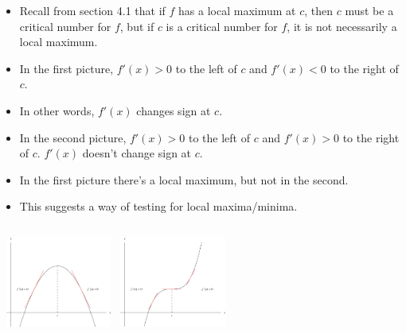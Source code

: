 \begin{frame}
\begin{itemize}
\item  Recall from section 4.1 that if $f$ has a local maximum at $c$, then $c$ must be a critical number for $f$, but if $c$ is a critical number for $f$, it is not necessarily a local maximum.
\item<2->  In the first picture, $f'(x) > 0$ to the left of $c$ and $f'(x) < 0$ to the right of $c$.
\item<3->  In other words, $f'(x)$ changes sign at $c$.
\item<4->  In the second picture, $f'(x) > 0$ to the left of $c$ and $f'(x) > 0$ to the right of $c$.  $f'(x)$ doesn't change sign at $c$.
\item<5->  In the first picture there's a local maximum, but not in the second.
\item<6->  This suggests a way of testing for local maxima/minima.
\end{itemize}
\begin{columns}[c]
\ \includegraphics[height=3cm]{curve-sketching/pictures/04-03-firstderiva.pdf}%
\ \includegraphics[height=3cm]{curve-sketching/pictures/04-03-firstderivc.pdf}%
\end{columns}
\end{frame}



